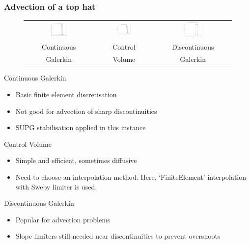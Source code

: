 \begin{frame}
  \frametitle{Advection of a top hat}
  \begin{figure}[ht]
    \begin{tabular}{ccc}
      \includegraphics[width=0.3\textwidth]{./top_hat/top_hat_cg.pdf} &
      \includegraphics[width=0.3\textwidth]{./top_hat/top_hat_cv.pdf} &
      \includegraphics[width=0.3\textwidth]{./top_hat/top_hat_dg.pdf} \\
      Continuous & Control & Discontinuous  \\
       Galerkin &  Volume & Galerkin
    \end{tabular}
  \end{figure}
\end{frame}

\begin{frame}
  Continuous Galerkin
  \begin{itemize}
  \item Basic finite element discretisation
  \item Not good for advection of sharp discontinuities
  \item SUPG stabilisation applied in this instance
  \end{itemize}
  \vspace{5pt}
  Control Volume
  \begin{itemize}
  \item Simple and efficient, sometimes diffusive
  \item Need to choose an interpolation method.  Here, `FiniteElement' interpolation with Sweby limiter is used.
  \end{itemize}
  \vspace{5pt}
  Discontinuous Galerkin
  \begin{itemize}
  \item Popular for advection problems
  \item Slope limiters still needed near discontinuities to prevent overshoots
  \end{itemize}
\end{frame}

